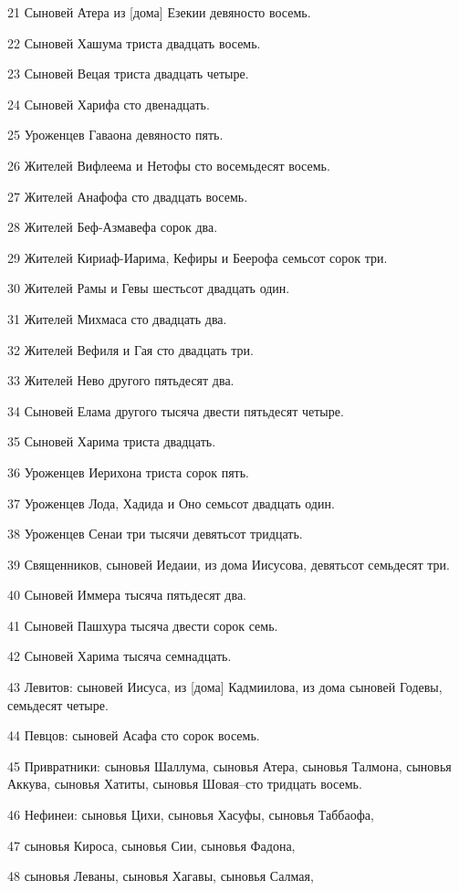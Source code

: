 \par 21 Сыновей Атера из [дома] Езекии девяносто восемь.
\par 22 Сыновей Хашума триста двадцать восемь.
\par 23 Сыновей Вецая триста двадцать четыре.
\par 24 Сыновей Харифа сто двенадцать.
\par 25 Уроженцев Гаваона девяносто пять.
\par 26 Жителей Вифлеема и Нетофы сто восемьдесят восемь.
\par 27 Жителей Анафофа сто двадцать восемь.
\par 28 Жителей Беф-Азмавефа сорок два.
\par 29 Жителей Кириаф-Иарима, Кефиры и Беерофа семьсот сорок три.
\par 30 Жителей Рамы и Гевы шестьсот двадцать один.
\par 31 Жителей Михмаса сто двадцать два.
\par 32 Жителей Вефиля и Гая сто двадцать три.
\par 33 Жителей Нево другого пятьдесят два.
\par 34 Сыновей Елама другого тысяча двести пятьдесят четыре.
\par 35 Сыновей Харима триста двадцать.
\par 36 Уроженцев Иерихона триста сорок пять.
\par 37 Уроженцев Лода, Хадида и Оно семьсот двадцать один.
\par 38 Уроженцев Сенаи три тысячи девятьсот тридцать.
\par 39 Священников, сыновей Иедаии, из дома Иисусова, девятьсот семьдесят три.
\par 40 Сыновей Иммера тысяча пятьдесят два.
\par 41 Сыновей Пашхура тысяча двести сорок семь.
\par 42 Сыновей Харима тысяча семнадцать.
\par 43 Левитов: сыновей Иисуса, из [дома] Кадмиилова, из дома сыновей Годевы, семьдесят четыре.
\par 44 Певцов: сыновей Асафа сто сорок восемь.
\par 45 Привратники: сыновья Шаллума, сыновья Атера, сыновья Талмона, сыновья Аккува, сыновья Хатиты, сыновья Шовая--сто тридцать восемь.
\par 46 Нефинеи: сыновья Цихи, сыновья Хасуфы, сыновья Таббаофа,
\par 47 сыновья Кироса, сыновья Сии, сыновья Фадона,
\par 48 сыновья Леваны, сыновья Хагавы, сыновья Салмая,
